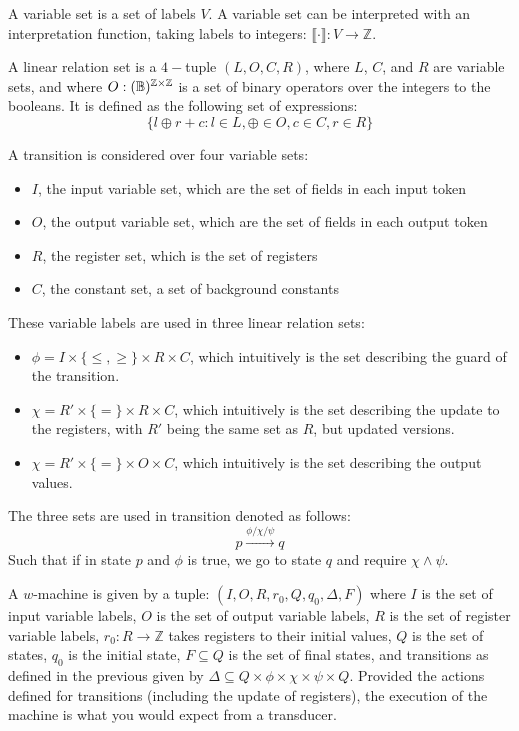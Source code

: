 \begin{definition}
A variable set is a set of labels $V$. A variable set can be interpreted with an interpretation function, taking labels to integers: $\llbracket \cdot \rrbracket : V \to \mathbb{Z}$.
\end{definition}

\begin{definition}
A linear relation set is a $4-$tuple $(L, O, C, R)$,
where $L$, $C$, and $R$ are variable sets,
and where $O : (\mathbb{B})^{\mathbb{Z} \times \mathbb{Z}}$ is a set of binary operators over the integers to the booleans.
It is defined as the following set of expressions:
$$\{l \oplus r + c : l \in L, \oplus \in O, c \in C, r \in R\}$$
\end{definition}

\begin{definition}[Transition]
A transition is considered over four variable sets:
\begin{itemize}
\item $I$, the input variable set, which are the set of fields in each input token
\item $O$, the output variable set, which are the set of fields in each output token
\item $R$, the register set, which is the set of registers
\item $C$, the constant set, a set of background constants
\end{itemize}
These variable labels are used in three linear relation sets:
\begin{itemize}
    \item $\phi = I \times \{\le, \ge\} \times R \times C$, which intuitively is the set describing the guard of the transition.
    \item $\chi = R'\times \{=\}\times R\times C$, which intuitively is the set describing the update to the registers, with $R'$ being the same set as $R$, but updated versions.
    \item $\chi = R'\times \{=\}\times O\times C$, which intuitively is the set describing the output values. 
\end{itemize}
The three sets are used in transition denoted as follows:
$$ p \xrightarrow{\phi / \chi / \psi} q$$
Such that if in state $p$ and $\phi$ is true, we go to state $q$ and require $\chi \wedge \psi$.
\end{definition}

\begin{definition}[$w$-machine]
A $w$-machine is given by a tuple:
$(I, O, R, r_0, Q, q_0, \Delta, F)$
where $I$ is the set of input variable labels,
$O$ is the set of output variable labels,
$R$ is the set of register variable labels,
$r_0 : R \to \mathbb{Z}$ takes registers to their initial values,
$Q$ is the set of states,
$q_0$ is the initial state,
$F \subseteq Q$ is the set of final states,
and transitions as defined in the previous given by $\Delta \subseteq Q \times \phi \times \chi \times \psi \times Q$.
Provided the actions defined for transitions (including the update of registers),
the execution of the machine is what you would expect from a transducer.
\end{definition}